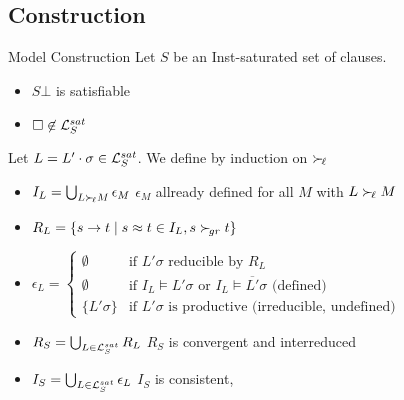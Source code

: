 \documentclass[%
handout,
]{beamer}
\begin{document}
\subsection{Construction}
\begin{frame}[allowframebreaks]{Model Construction}
    Let $S$ be an Inst-saturated set of clauses.
    \begin{itemize}
        \item $S\bot$ is satisfiable 
        \item $\square\not\in\mathcal{L}_S^{sat}$
        
\end{itemize}

\vspace{1.4em}
    Let $L = L'\cdot\sigma \in\mathcal{L}_S^{sat}$.
    We define by induction on $\mathrel\succ_{\!\ell}$
        \begin{itemize}
            \item $I_L = \bigcup_{L\mathrel\succ_{\!\ell} M}\epsilon_M$
            \hfill $\epsilon_M$ allready defined for all $M$ with $L\mathrel\succ_{\!\ell} M$

            \item $R_L = \{ s \to t \mid s\approx t\in I_L, s\mathrel\succ_{\!gr} t \}$
            
                \item $\epsilon_L = \left\{
                    \begin{array}{cl}
                        \emptyset &\text{if }
                        L'\sigma\text{ reducible by }R_L
                        \\
                        \emptyset &\text{if }
                        I_L\vDash L'\sigma
                        \text{ or }
                        I_L\vDash \overline{L'}\sigma
                        \text{ (defined)}
                        \\
                        \{ L'\sigma \}
                        &\text{if }L'\sigma \text{ is productive (irreducible, undefined)}
                    \end{array}
                \right.$

                \framebreak
            \item 
            $R_S = \bigcup_{L\in\mathcal{L}_S^{sat}} R_L$
            \hfill 
            $R_S$ is convergent and interreduced

            \vspace{0.7em}
            \item
            $I_S = \bigcup_{L\in\mathcal{L}_S^{sat}} \epsilon_L$
            \hfill
            $I_S$ is consistent, 
            

\end{itemize}
\end{frame}
\end{document}
